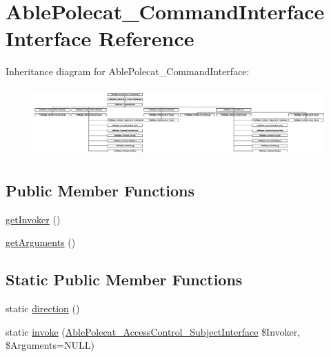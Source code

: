 \hypertarget{interface_able_polecat___command_interface}{}\section{Able\+Polecat\+\_\+\+Command\+Interface Interface Reference}
\label{interface_able_polecat___command_interface}
Inheritance diagram for Able\+Polecat\+\_\+\+Command\+Interface\+:\begin{figure}[H]
\begin{center}
\leavevmode
\includegraphics[height=2.649842cm]{interface_able_polecat___command_interface}
\end{center}
\end{figure}
\subsection*{Public Member Functions}
\begin{DoxyCompactItemize}
\item 
\hyperlink{interface_able_polecat___command_interface_a059205d72a39460f114b68e5fa2b23b6}{get\+Invoker} ()
\item 
\hyperlink{interface_able_polecat___command_interface_a1d4c324c5a088be98d99d3efbf3502e1}{get\+Arguments} ()
\end{DoxyCompactItemize}
\subsection*{Static Public Member Functions}
\begin{DoxyCompactItemize}
\item 
static \hyperlink{interface_able_polecat___command_interface_a0f38ef3cd761210f2a667c669393498f}{direction} ()
\item 
static \hyperlink{interface_able_polecat___command_interface_a6821480fe527af0afdf3691d7cffad5f}{invoke} (\hyperlink{interface_able_polecat___access_control___subject_interface}{Able\+Polecat\+\_\+\+Access\+Control\+\_\+\+Subject\+Interface} \$Invoker, \$Arguments=N\+U\+L\+L)
\end{DoxyCompactItemize}


